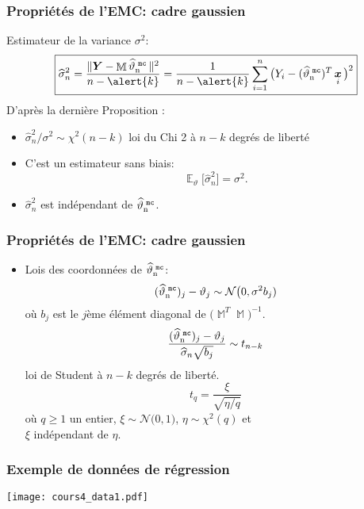 \documentclass{beamer}
\DeclareMathOperator{\E}{{\mathbb E}}
\DeclareMathOperator{\bx}{\boldsymbol{x}}
\DeclareMathOperator{\estMC}{\widehat \vartheta_n^{\,\,{\tt mc}}}
\DeclareMathOperator{\design}{\mathbb{M}}
\begin{document}
\begin{frame}
\frametitle{Propriétés de l'EMC: cadre gaussien}

Estimateur de la variance $\sigma^2$:
$$\boxed{\widehat \sigma_n^2 = \frac{\|\boldsymbol{Y}-\design \estMC\|^2}{n-\alert{k}} = \frac{1}{n-\alert{k}}\sum_{i = 1}^n\big(Y_i-(\estMC)^T\bx_i\big)^2}$$
D'apr\`es la derni\`ere Proposition :
\begin{itemize}
\item $\widehat
\sigma_n^2/\sigma^2 \sim \chi^2(n-k)$ \alert{ loi du Chi 2 à
$n-k$ degrés de liberté}
\item C'est un estimateur \alert{sans biais}: $$\E_\vartheta\big[\widehat
\sigma_n^2\big]=\sigma^2.$$
\item $\widehat
\sigma_n^2$ est \alert{indépendant} de $\estMC$.
\end{itemize}
\end{frame}

\begin{frame}
\frametitle{Propriétés de l'EMC: cadre gaussien}
\begin{itemize}
\item Lois des coordonnées de $\estMC$:
$$
(\estMC)_j -\vartheta_j \sim {\mathcal N}\big(0, \sigma^2 b_j)
$$
o\`u $b_j$ est le $j$\`eme élément diagonal de $\big(\design^T
\design\big)^{-1}$. $$ \frac{(\estMC)_j -\vartheta_j}{\widehat
\sigma_n \sqrt{b_j}} \sim t_{n-k}$$ \alert{loi de Student \`a
$n-k$ degrés de liberté}.
$$ t_q = \frac{\xi}{\sqrt{\eta/q}}$$
o\`u $q\ge 1$ un entier, $\xi\sim {\mathcal N}\big(0,1)$, $\eta\sim
\chi^2(q)$ et\\ $\xi$ \alert{indépendant} de $\eta$.
\end{itemize}
\end{frame}

\begin{frame}
    \frametitle{Exemple de données de régression}
\begin{center}
\vspace{-2.5cm}
\texttt{[image: cours4\_data1.pdf]}\hspace{4cm}
\end{center}
\end{frame}
\end{document}
